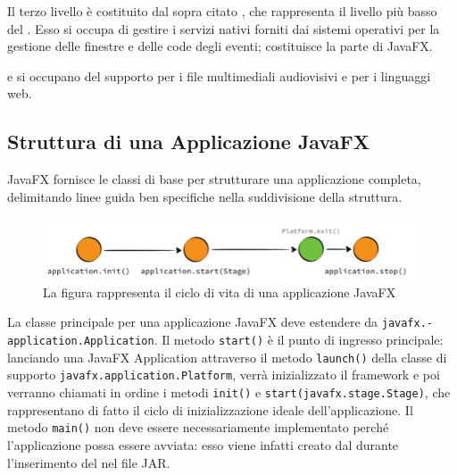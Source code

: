             Il terzo livello è costituito dal sopra citato , che rappresenta il livello più basso del .
            Esso si occupa di gestire i servizi nativi forniti dai sistemi operativi per la gestione delle finestre e delle code degli eventi;
            costituisce la parte  di JavaFX.

             e  si occupano del supporto per i file multimediali audiovisivi e per i linguaggi web.

        \subsection{Struttura di una Applicazione JavaFX}\label{subsec:jfxStruttura}

            JavaFX fornisce le classi di base per strutturare una applicazione completa, delimitando linee guida ben specifiche nella suddivisione della struttura.

            \begin{figure}[htbp]
                \centering
                \includegraphics[scale=1]{img/jfxLifecycle}
                \caption{La figura rappresenta il ciclo di vita di una applicazione JavaFX}
                \label{fig:jfxLife}
            \end{figure}

            La classe principale per una applicazione JavaFX deve estendere da \texttt{javafx\dothyp application\dothyp Application}.
            Il metodo \texttt{start()} è il punto di ingresso principale:
            lanciando una JavaFX Application attraverso il metodo \texttt{launch()} della classe di supporto \texttt{javafx\dothyp application\dothyp Platform}, verrà inizializzato il framework e poi verranno chiamati in ordine i metodi \texttt{init()} e \texttt{start(javafx\dothyp stage\dothyp Stage)}, che rappresentano di fatto il ciclo di inizializzazione ideale dell'applicazione.
            Il metodo \texttt{main()} non deve essere necessariamente implementato perché l'applicazione possa essere avviata:
            esso viene infatti creato dal  durante l'inserimento del  nel file JAR.

